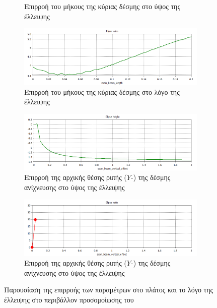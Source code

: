\begin{figure}[tph]
\begin{subfigure}{0.47\textwidth}
		\centering
		\caption{Επιρροή του μήκους της κύριας δέσμης στο ύψος της έλλειψης}
		\label{fig:CST-ellipse-height-by-bunch-length}
	\end{subfigure}
	\hfill	
	\begin{subfigure}{0.47\textwidth}
		\includegraphics[width=\linewidth]{figures/CST-variable-analysis/CST-ellipse-ratio-by-bunch-length}
		\centering
		\caption{Επιρροή του μήκους της κύριας δέσμης στο λόγο της έλλειψης}
		\label{fig:CST-ellipse-ratio-by-bunch-length}
	\end{subfigure}		
	\par\bigskip
	\begin{subfigure}{0.47\textwidth}
		\includegraphics[width=\linewidth]{figures/CST-variable-analysis/CST-ellipse-height-by-vertical-offset}
		\centering
		\caption{Επιρροή της αρχικής θέσης ριπής ($Y$-) της δέσμης ανίχνευσης στο ύψος της έλλειψης}
		\label{fig:CST-ellipse-height-by-vertical-offset}
	\end{subfigure}
	\hfill
	\begin{subfigure}{0.47\textwidth}
		\includegraphics[width=\linewidth]{figures/CST-variable-analysis/CST-ellipse-ratio-by-vertical-offset}
		\centering
		\caption{Επιρροή της αρχικής θέσης ριπής ($Y$-) της δέσμης ανίχνευσης στο ύψος της έλλειψης}
		\label{fig:CST-ellipse-ratio-by-vertical-offset}
	\end{subfigure}
\caption{Παρουσίαση της επιρροής των παραμέτρων στο πλάτος και το λόγο της έλλειψης στο περιβάλλον προσομοίωσης του }	
\label{fig:EBS-CST-variables}
\end{figure}



